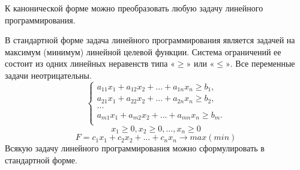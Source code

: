 \documentclass[12pt]{article}
\begin{document}
К канонической форме можно преобразовать любую задачу линейного
программирования.

В стандартной форме задача линейного программирования является задачей на
максимум (минимум) линейной целевой функции. Система ограничений ее состоит из
одних линейных неравенств типа $«\ge»$ или $«\le»$. Все переменные задачи
неотрицательны.
\begin{equation}
 \begin{cases}
  a_{11}x_1 +a_{12}x_2+...+a_{1n}x_n \ge b_1,\\ 
  a_{21}x_1 +a_{22}x_2+...+a_{2n}x_n \ge b_2,\\
  ...\\
  a_{m1}x_1 +a_{m2}x_2+...+a_{mn}x_n\ge b_m.\\
 \end{cases}
\end{equation}
\begin{equation}
x_1\ge0, x_2\ge0, ..., x_n\ge0
\end{equation}
\begin{equation}
F=c_1x_1+c_2x_2 + ... + c_nx_n \rightarrow max(min)
\end{equation}
Всякую задачу линейного программирования можно сформулировать в
стандартной форме.
\end{document}
